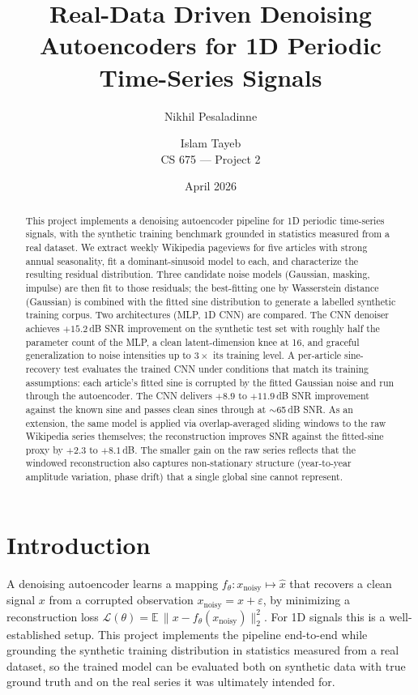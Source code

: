 \documentclass[11pt]{article}
\title{Real-Data Driven Denoising Autoencoders for 1D Periodic Time-Series Signals}
\author{Nikhil Pesaladinne \and Islam Tayeb \\ CS 675 --- Project 2}
\date{April 2026}
\begin{document}
\maketitle

\begin{abstract}
This project implements a denoising autoencoder pipeline for 1D periodic time-series signals, with the synthetic training benchmark grounded in statistics measured from a real dataset. We extract weekly Wikipedia pageviews for five articles with strong annual seasonality, fit a dominant-sinusoid model to each, and characterize the resulting residual distribution. Three candidate noise models (Gaussian, masking, impulse) are then fit to those residuals; the best-fitting one by Wasserstein distance (Gaussian) is combined with the fitted sine distribution to generate a labelled synthetic training corpus. Two architectures (MLP, 1D CNN) are compared. The CNN denoiser achieves $+15.2$\,dB SNR improvement on the synthetic test set with roughly half the parameter count of the MLP, a clean latent-dimension knee at 16, and graceful generalization to noise intensities up to $3\times$ its training level. A per-article sine-recovery test evaluates the trained CNN under conditions that match its training assumptions: each article's fitted sine is corrupted by the fitted Gaussian noise and run through the autoencoder. The CNN delivers $+8.9$ to $+11.9$\,dB SNR improvement against the known sine and passes clean sines through at $\sim$65\,dB SNR. As an extension, the same model is applied via overlap-averaged sliding windows to the raw Wikipedia series themselves; the reconstruction improves SNR against the fitted-sine proxy by $+2.3$ to $+8.1$\,dB. The smaller gain on the raw series reflects that the windowed reconstruction also captures non-stationary structure (year-to-year amplitude variation, phase drift) that a single global sine cannot represent.
\end{abstract}

\section{Introduction}

A denoising autoencoder learns a mapping $f_\theta: x_{\text{noisy}} \mapsto \hat{x}$ that recovers a clean signal $x$ from a corrupted observation $x_{\text{noisy}} = x + \varepsilon$, by minimizing a reconstruction loss $\mathcal{L}(\theta) = \mathbb{E}\,\| x - f_\theta(x_{\text{noisy}}) \|_2^2$. For 1D signals this is a well-established setup. This project implements the pipeline end-to-end while grounding the synthetic training distribution in statistics measured from a real dataset, so the trained model can be evaluated both on synthetic data with true ground truth and on the real series it was ultimately intended for.
\end{document}
